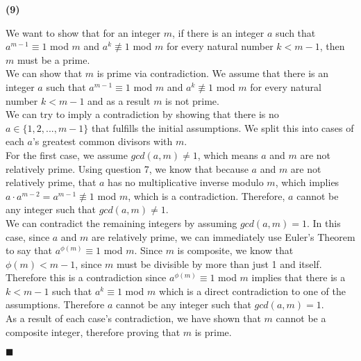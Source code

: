 \documentclass[20pt]{article}
\begin{document}
\noindent
\textbf{(9)}
\begin{text}
    We want to show that for an integer $m$, if there is an integer $a$ such that $a^{m - 1} \equiv 1$ mod $m$ and $a^k \not\equiv 1$ mod $m$ for every natural number $k < m - 1$, then $m$ must be a prime.\\
    
    \noindent
    We can show that $m$ is prime via contradiction. We assume that there is an integer $a$ such that $a^{m - 1} \equiv 1$ mod $m$ and $a^k \not\equiv 1$ mod $m$ for every natural number $k < m - 1$ and as a result $m$ is not prime.\\
    
    \noindent
    We can try to imply a contradiction by showing that there is no $a \in \{1, 2, ... , m - 1\}$ that fulfills the initial assumptions. We split this into cases of each $a$'s greatest common divisors with $m$.\\
    
    \noindent
    For the first case, we assume $gcd(a, m) \neq 1$, which means $a$ and $m$ are not relatively prime. Using question 7, we know that because $a$ and $m$ are not relatively prime, that $a$ has no multiplicative inverse modulo $m$, which implies $a \cdot a^{m - 2} = a^{m - 1} \not\equiv 1$ mod $m$, which is a contradiction. Therefore, $a$ cannot be any integer such that $gcd(a, m) \neq 1$.\\
    
    \noindent
    We can contradict the remaining integers by assuming $gcd(a, m) = 1$. In this case, since $a$ and $m$ are relatively prime, we can immediately use Euler's Theorem to say that $a^{\phi(m)} \equiv 1$ mod $m$. Since $m$ is composite, we know that $\phi(m) < m - 1$, since $m$ must be divisible by more than just 1 and itself. Therefore this is a contradiction since $a^{\phi(m)} \equiv 1$ mod $m$ implies that there is a $k < m - 1$ such that $a^k \equiv 1$ mod $m$ which is a direct contradiction to one of the assumptions. Therefore $a$ cannot be any integer such that $gcd(a, m) = 1$.\\
    
    \noindent
    As a result of each case's contradiction, we have shown that $m$ cannot be a composite integer, therefore proving that $m$ is prime.
    
    \hfill $\blacksquare$
\end{text}\\
\end{document}
